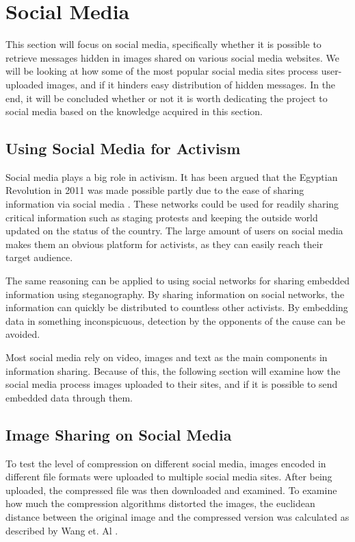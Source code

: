 \clearpage

\section{Social Media}
This section will focus on social media, specifically whether it is possible to retrieve messages hidden in images shared on various social media websites.
We will be looking at how some of the most popular social media sites process user-uploaded images, and if it hinders easy distribution of hidden messages.
In the end, it will be concluded whether or not it is worth dedicating the project to social media based on the knowledge acquired in this section.

\subsection{Using Social Media for Activism}
\label{sec:socialmedia}
Social media plays a big role in activism.
It has been argued that the Egyptian Revolution in 2011 was made possible partly due to the ease of sharing information via social media \citep{IJoC1242}.
These networks could be used for readily sharing critical information such as staging protests and keeping the outside world updated on the status of the country.
The large amount of users on social media makes them an obvious platform for activists, as they can easily reach their target audience.

The same reasoning can be applied to using social networks for sharing embedded information using steganography.
By sharing information on social networks, the information can quickly be distributed to countless other activists. By embedding data in something inconspicuous, detection by the opponents of the cause can be avoided.

Most social media rely on video, images and text as the main components in information sharing.
Because of this, the following section will examine how the social media process images uploaded to their sites, and if it is possible to send embedded data through them.

\subsection{Image Sharing on Social Media}
To test the level of compression on different social media, images encoded in different file formats were uploaded to multiple social media sites.
After being uploaded, the compressed file was then downloaded and examined.
To examine how much the compression algorithms distorted the images, the euclidean distance between the original image and the compressed version was calculated as described by Wang et. Al \citep{Wang2005}.

